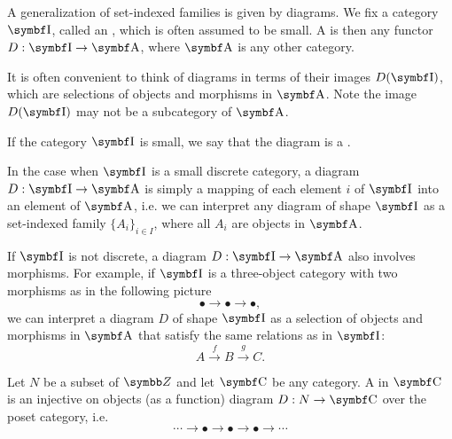 \begin{definition}\label{def:categorical_diagram}
  A generalization of set-indexed families is given by diagrams. We fix a category \( \Bold I \), called an , which is often assumed to be small. A  is then any functor \( D: \Bold I \to \Cat{A} \), where \( \Cat{A} \) is any other category.

  It is often convenient to think of diagrams in terms of their images \( D(\Bold I) \), which are selections of objects and morphisms in \( \Cat{A} \). Note the image \( D(\Bold I) \) may not be a subcategory of \( \Cat{A} \).

  If the category \( \Bold I \) is small, we say that the diagram is a .
\end{definition}

\begin{example}\label{ex:categorical_diagrams}
  \mbox{}
  \begin{defenum}
    \item In the case when \( \Bold I \) is a small discrete category, a diagram \( D: \Bold I \to \Cat{A} \) is simply a mapping of each element \( i \) of \( \Bold I \) into an element of \( \Cat{A} \), i.e. we can interpret any diagram of shape \( \Bold I \) as a set-indexed family \( \{ A_i \}_{i \in I} \), where all \( A_i \) are objects in \( \Cat{A} \).

    \item If \( \Bold I \) is not discrete, a diagram \( D: \Bold I \to \Cat{A} \) also involves morphisms. For example, if \( \Bold I \) is a three-object category with two morphisms as in the following picture
    \begin{equation*}
      \bullet \longrightarrow \bullet \longrightarrow \bullet,
    \end{equation*}
    we can interpret a diagram \( D \) of shape \( \Bold I \) as a selection of objects and morphisms in \( \Cat{A} \) that satisfy the same relations as in \( \Bold I \):
    \begin{equation*}
      A
      \overset f \longrightarrow
      B
      \overset g \longrightarrow
      C.
    \end{equation*}
  \end{defenum}
\end{example}

\begin{definition}\label{def:tower_diagram}
  Let \( N \) be a subset of \( \BZ \) and let \( \Cat{C} \) be any category. A  in \( \Bold{C} \) is an injective on objects (as a function) diagram \( D: N \to \Bold{C} \) over the poset category, i.e.
  \begin{equation}\label{def:tower_diagram/diagram}
    \cdots \longrightarrow \bullet \longrightarrow \bullet \longrightarrow \bullet \longrightarrow \cdots
  \end{equation}
\end{definition}

